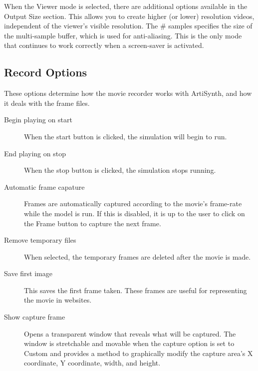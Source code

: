 \documentclass{article}
\begin{document}
When the {\sf Viewer} mode is selected, there are additional options
available in the {\sf Output Size} section.  This allows you to create
higher (or lower) resolution videos, independent of the viewer's 
visible resolution.  The {\sf \# samples} specifies the size of the
multi-sample buffer, which is used for anti-aliasing.  This is the
only mode that continues to work correctly when a screen-saver
is activated.  

\subsection{Record Options}

These options determine how the movie recorder works with ArtiSynth,
and how it deals with the frame files.

\begin{description}

\item[Begin playing on start]\mbox{}

When the {\sf start} button is clicked, the simulation will begin to run.

\item[End playing on stop]\mbox{}

When the {\sf stop} button is clicked, the simulation stops running.

\item[Automatic frame capature]\mbox{}

Frames are automatically captured according to the movie's frame-rate 
while the model is run.  If this is disabled, it is up to the user
to click on the {\sf Frame} button to capture the next frame.

\item[Remove temporary files]\mbox{}

When selected, the temporary frames are deleted after the movie is made.

\item[Save first image]\mbox{}

This saves the first frame taken. These frames are useful for
representing the movie in websites.

\item[Show capture frame]\mbox{}

Opens a transparent window that reveals what will be captured. The window
is stretchable and movable when the capture option is set to {\sf Custom} and
provides a method to graphically modify the capture area's X coordinate,
Y coordinate, width, and height.

\end{description}
\end{document}
